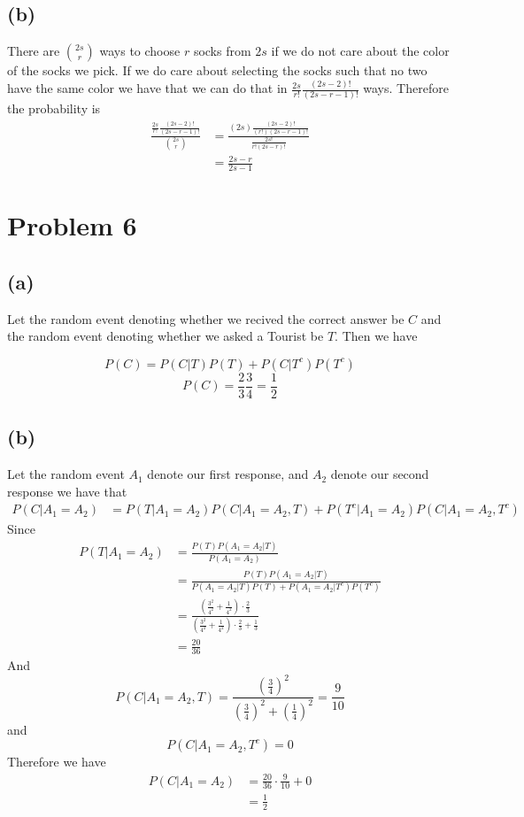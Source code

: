 \subsection*{(b)}
There are $2s \choose r$ ways to choose $r$ socks from $2s$ if we do not care about the color of the socks we pick. If we do care about
selecting the socks such that no two have the same color we have that we can do that
in $\frac{2s}{r!}\frac{(2s-2)!}{(2s-r-1)!}$ ways. 
Therefore the probability is 
\begin{align*}
    \frac{\frac{2s}{r!}\frac{(2s-2)!}{(2s-r-1)!}}{{2s \choose r}}&=\frac{(2s)\frac{(2s-2)!}{(r!)(2s-r-1)!}}{\frac{2s!}{r!(2s-r)!}}\\
    &=\boxed{\frac{2s-r}{2s-1}}
\end{align*}

\section*{Problem 6}
\subsection*{(a)}
Let the random event denoting whether we recived the correct answer 
be $C$ and the random event denoting whether we asked a Tourist be 
$T$. Then we have

$$P(C)=P(C|T)P(T)+P(C|T^c)P(T^c)$$
$$P(C)=\frac{2}{3}\frac{3}{4}=\boxed{\frac{1}{2}}$$
\subsection*{(b)}
Let the random event $A_1$ denote our first response, and $A_2$ denote our
second response we have that
\begin{align*}
    P(C|A_1=A_2)&=P(T|A_1=A_2)P(C|A_1=A_2,T)+P(T^c|A_1=A_2)P(C|A_1=A_2,T^c)
\end{align*}
Since 
\begin{align*}
    P(T|A_1=A_2)&=\frac{P(T)P(A_1=A_2|T)}{P(A_1=A_2)}\\
    &=\frac{P(T)P(A_1=A_2|T)}{P(A_1=A_2|T)P(T)+P(A_1=A_2|T^c)P(T^c)}\\
    &=\frac{\left(\frac{3^2}{4^2}+\frac{1}{4^2}\right)\cdot\frac{2}{3}}{\left(\frac{3^2}{4^2}+\frac{1}{4^2}\right)\cdot\frac{2}{3}+\frac{1}{3}}\\
    &=\frac{20}{36}
\end{align*}
And 
$$P(C|A_1=A_2,T)=\frac{\left(\frac{3}{4}\right)^2}{\left(\frac{3}{4}\right)^2+\left(\frac{1}{4}\right)^2}=\frac{9}{10}$$
and 
$$P(C|A_1=A_2,T^c)=0$$
Therefore we have
\begin{align*}
    P(C|A_1=A_2)&=\frac{20}{36}\cdot\frac{9}{10}+0\\
    &=\boxed{\frac{1}{2}}
\end{align*}
